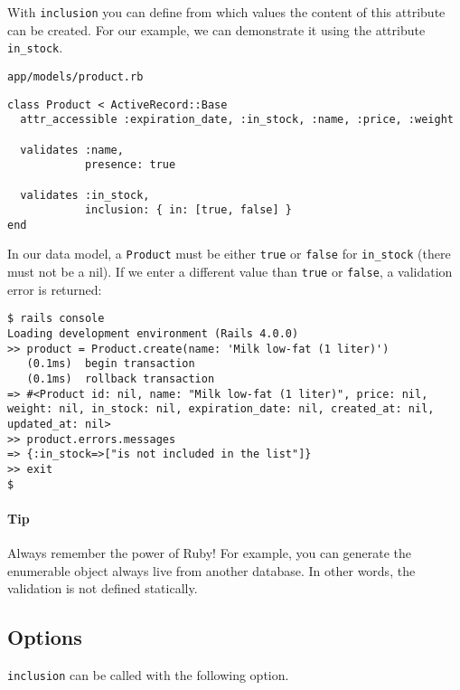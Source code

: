 \documentclass[a4paper]{book}
\newcounter{tab}[chapter]
\begin{document}
With \texttt{inclusion} you can define from which values the content of this attribute can be created. For our example, we can demonstrate it using the attribute \texttt{in\_stock}.

\texttt{app/models/product.rb}

\begin{shaded}\begin{verbatim}
class Product < ActiveRecord::Base
  attr_accessible :expiration_date, :in_stock, :name, :price, :weight

  validates :name,
            presence: true

  validates :in_stock,
            inclusion: { in: [true, false] }
end
\end{verbatim}\end{shaded}

In our data model, a \texttt{Product} must be either \texttt{true} or \texttt{false} for \texttt{in\_stock} (there must not be a nil). If we enter a different value than \texttt{true} or \texttt{false}, a validation error is returned:

\begin{shaded}\begin{verbatim}
$ rails console
Loading development environment (Rails 4.0.0)
>> product = Product.create(name: 'Milk low-fat (1 liter)')
   (0.1ms)  begin transaction
   (0.1ms)  rollback transaction
=> #<Product id: nil, name: "Milk low-fat (1 liter)", price: nil, weight: nil, in_stock: nil, expiration_date: nil, created_at: nil, updated_at: nil>
>> product.errors.messages
=> {:in_stock=>["is not included in the list"]}
>> exit
$
\end{verbatim}\end{shaded}

\paragraph{Tip}\label{tip-11}

Always remember the power of Ruby! For example, you can generate the enumerable object always live from another database. In other words, the validation is not defined statically.

\subsection{Options}\label{options-6}

\texttt{inclusion} can be called with the following option.
\end{document}
